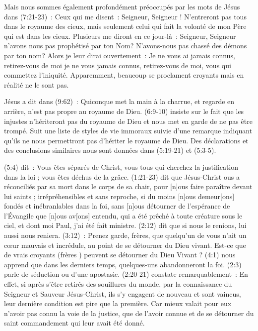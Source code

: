 \begin{enumerate}
Mais nous sommes également profondément préoccupés par les mots de Jésus dans (7:21-23)~:
 \og Ceux qui me disent~: Seigneur, Seigneur ! N'entreront pas tous dans le royaume des cieux,
 mais seulement celui qui fait la volonté de mon Père qui est dans les cieux.
 Plusieurs me diront en ce jour-là~: Seigneur, Seigneur n'avons nous pas prophétisé par  ton Nom?
 N'avons-nous pas chassé des démons par ton nom? Alors je leur dirai ouvertement~:
 Je ne vous ai jamais connus, retirez-vous de moi je ne vous jamais connus, retirez-vous de moi,
 vous qui commettez l'iniquité. \fg{}
 Apparemment, beaucoup se proclament croyants mais en réalité ne le sont pas.

Jésus a dit dans (9:62)~: \og Quiconque met la main à la charrue,
 et regarde en arrière, n'est pas propre au royaume de Dieu. \fg{}
 (6:9-10) insiste sur le fait que
 \og les injustes n'hériteront pas du royaume de Dieu \fg{}
 et nous met en garde de ne pas être trompé. 
 Suit une liste de styles de vie immoraux suivie d'une remarque
 indiquant qu'ils ne nous permettront pas d'hériter le royaume de Dieu.
 Des déclarations et des conclusions similaires nous sont données
 dans (5:19-21) et (5:3-5).

(5:4) dit~: \og Vous êtes séparés de Christ,
 vous tous qui cherchez la justification dans la loi ;
 vous êtes déchus de la grâce. \fg{}
 (1:21-23) dit que Jésus-Christ
 \og [n]ous a réconciliés par sa mort dans le corps de sa chair,
 pour [n]ous faire paraître devant lui saints ; irrépréhensibles et sans reproche,
 si du moins [n]ous demeur[ons] fondés et inébranlables dans la foi,
 sans [n]ous détourner de l'espérance de l'Évangile que [n]ous av[ons] entendu,
 qui a été prêché à toute créature sous le ciel, et dont moi Paul, j'ai été fait ministre. \fg{}
 (2:12) dit que \og si nous le renions, lui aussi nous reniera. \og
 (3:12)~: \og Prenez garde, frères, que quelqu'un de vous n'ait un cœur mauvais
 et incrédule, au point de se détourner du Dieu vivant. \fg{}
 Est-ce que de vrais croyants (\og frères \fg{}) peuvent se détourner du Dieu Vivant ?
 (4:1) nous apprend que \og dans les derniers temps, quelques-uns abandonneront la foi. \fg{}
 (2:3) parle de \og séduction \fg{} ou d'une apostasie.
 (2:20-21) constate remarquablement~: \og En effet, si après s'être retirés
 des souillures du monde, par la connaissance du Seigneur et Sauveur Jésus-Christ,
 ils s'y engagent de nouveau et sont vaincus, leur dernière condition est pire que la première.
 Car mieux valait pour eux n'avoir pas connu la voie de la justice,
 que de l'avoir connue et de se détourner du saint commandement  qui leur avait été donné. \fg{}


\end{enumerate}
